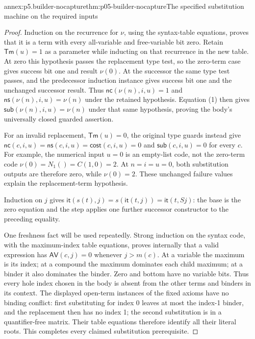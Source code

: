 \begin{annexitem}{annex:p5.builder-nocapture}{thm:p05-builder-nocapture}{The specified substitution machine on the required inputs}
\begin{proof}
Induction on the recurrence for \(\nu\), using the syntax-table equations,
proves that it is a term with every all-variable and free-variable bit zero.
Retain \(\mathsf{Tm}(u)=1\) as a parameter while inducting on that
recurrence in the new table. At zero this hypothesis passes the replacement
type test, so the zero-term case gives success bit one and result \(\nu(0)\).
At the successor the same type test passes, and the predecessor induction
instance gives success bit one and the unchanged successor result. Thus
\(\mathsf{nc}(\nu(n),i,u)=1\) and
\(\mathsf{ns}(\nu(n),i,u)=\nu(n)\) under the retained hypothesis.
Equation (1) then gives \(\mathsf{sub}(\nu(n),i,u)=\nu(n)\) under that
same hypothesis, proving the body's universally closed guarded assertion.

For an invalid replacement, \(\mathsf{Tm}(u)=0\), the original type guards
instead give \(\mathsf{nc}(c,i,u)=\mathsf{ns}(c,i,u)=
\mathsf{cost}(c,i,u)=0\) and \(\mathsf{sub}(c,i,u)=0\) for every \(c\).
For example, the numerical input \(u=0\) is an empty-list code, not the
zero-term code \(\nu(0)=N_1()=C(1,0)=2\). At \(n=i=u=0\), both
substitution outputs are therefore zero, while \(\nu(0)=2\). These
unchanged failure values explain the replacement-term hypothesis.

Induction on \(j\) gives
\(\mathsf{it}(s(t),j)=s(\mathsf{it}(t,j))=\mathsf{it}(t,Sj)\):
the base is the zero equation and the step applies one further successor
constructor to the preceding equality.

One freshness fact will be used repeatedly. Strong induction on the syntax
code, with the maximum-index table equations, proves internally that a valid
expression has \(\mathsf{AV}(c,j)=0\) whenever \(j>m(c)\). At a variable
the maximum is its index; at a compound the maximum dominates each child
maximum; at a binder it also dominates the binder. Zero and bottom have no
variable bits. Thus every hole index chosen in the body is absent from the
other terms and binders in its context. The displayed open-term instances
of the fixed axioms have no binding conflict: first substituting for index
0 leaves at most the index-1 binder, and the replacement then has no index 1;
the second substitution is in a quantifier-free matrix. Their table equations
therefore identify all their literal roots. This completes every claimed
substitution prerequisite.
\end{proof}
\end{annexitem}

